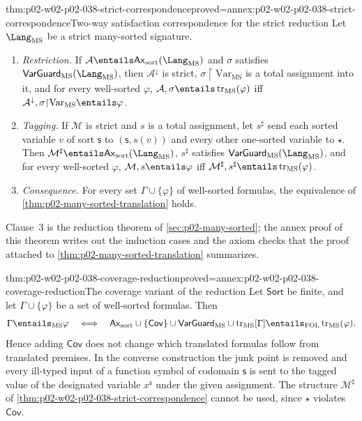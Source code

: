 \begin{hbtheorem}{thm:p02-w02-p02-038-strict-correspondence}{proved=annex:p02-w02-p02-038-strict-correspondence}{Two-way satisfaction correspondence for the strict reduction}
Let \(\Lang_{\mathrm{MS}}\) be a strict many-sorted signature.
\begin{enumerate}
\item \emph{Restriction.}  If \(\mathcal A\entails
      \mathsf{Ax}_{\mathrm{sort}}(\Lang_{\mathrm{MS}})\) and \(\sigma\)
      satisfies \(\mathsf{VarGuard}_{\mathrm{MS}}(\Lang_{\mathrm{MS}})\),
      then \(\mathcal A^{\downarrow}\) is strict,
      \(\sigma{\restriction}\mathrm{Var}_{\mathrm{MS}}\) is a total
      assignment into it, and for every well-sorted \(\varphi\),
      \(\mathcal A,\sigma\entails\operatorname{tr}_{\mathrm{MS}}(\varphi)\)
      iff
      \(\mathcal A^{\downarrow},\sigma{\restriction}\mathrm{Var}_{\mathrm{MS}}
      \entails\varphi\).
\item \emph{Tagging.}  If \(\mathcal M\) is strict and \(s\) is a total
      assignment, let \(s^{\sharp}\) send each sorted variable \(v\) of sort
      \(\mathsf s\) to \((\mathsf s,s(v))\) and every other one-sorted
      variable to \(\star\).  Then \(\mathcal M^{\sharp}\entails
      \mathsf{Ax}_{\mathrm{sort}}(\Lang_{\mathrm{MS}})\), \(s^{\sharp}\)
      satisfies \(\mathsf{VarGuard}_{\mathrm{MS}}(\Lang_{\mathrm{MS}})\), and
      for every well-sorted \(\varphi\),
      \(\mathcal M,s\entails\varphi\) iff
      \(\mathcal M^{\sharp},s^{\sharp}\entails
      \operatorname{tr}_{\mathrm{MS}}(\varphi)\).
\item \emph{Consequence.}  For every set \(\Gamma\cup\{\varphi\}\) of
      well-sorted formulas, the equivalence of
      \cref{thm:p02-many-sorted-translation} holds.
\end{enumerate}
\end{hbtheorem}

Clause~3 is the reduction theorem of \cref{sec:p02-many-sorted}; the annex
proof of this theorem writes out the induction cases and the axiom checks
that the proof attached to \cref{thm:p02-many-sorted-translation} summarizes.

\begin{hbtheorem}{thm:p02-w02-p02-038-coverage-reduction}{proved=annex:p02-w02-p02-038-coverage-reduction}{The coverage variant of the reduction}
Let \(\mathsf{Sort}\) be finite, and let \(\Gamma\cup\{\varphi\}\) be a set
of well-sorted formulas.  Then
\[
 \Gamma\entails_{\mathrm{MS}}\varphi
 \quad\Longleftrightarrow\quad
 \mathsf{Ax}_{\mathrm{sort}}\cup\{\mathsf{Cov}\}
   \cup\mathsf{VarGuard}_{\mathrm{MS}}
   \cup\operatorname{tr}_{\mathrm{MS}}[\Gamma]
 \entails_{\mathrm{FOL}}\operatorname{tr}_{\mathrm{MS}}(\varphi).
\]
Hence adding \(\mathsf{Cov}\) does not change which translated formulas
follow from translated premises.  In the converse construction the junk point
is removed and every ill-typed input of a function symbol of codomain
\(\mathsf s\) is sent to the tagged value of the designated variable
\(x^{\mathsf s}\) under the given assignment.  The structure
\(\mathcal M^{\sharp}\) of \cref{thm:p02-w02-p02-038-strict-correspondence}
cannot be used, since \(\star\) violates \(\mathsf{Cov}\).
\end{hbtheorem}

